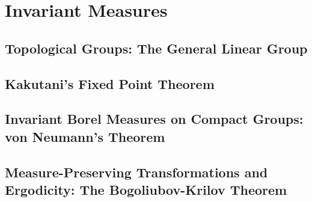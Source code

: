 \documentclass[a4paper,10pt]{book}
\theoremstyle{plain} %
\begin{document}
\chapter{Invariant Measures}

\section{Topological Groups: The General Linear Group}
\section{Kakutani's Fixed Point Theorem}
\section{Invariant Borel Measures on Compact Groups: von Neumann's Theorem}
\section{Measure-Preserving Transformations and Ergodicity: The Bogoliubov-Krilov Theorem}
\end{document}
